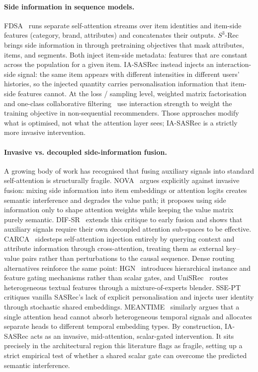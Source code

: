 \paragraph{Side information in sequence models.}
FDSA~\citep{zhang2019fdsa} runs separate self-attention streams over
item identities and item-side features (category, brand, attributes)
and concatenates their outputs. $S^3$-Rec~\citep{zhou2020s3rec} brings
side information in through pretraining objectives that mask
attributes, items, and segments. Both inject
item-side metadata: features that are constant across the
population for a given item. IA-SASRec instead injects an
interaction-side signal: the same item appears with different
intensities in different users' histories, so the injected quantity
carries personalisation information that item-side features cannot.
At the loss / sampling level, weighted matrix
factorisation~\citep{hu2008cf} and one-class collaborative
filtering~\citep{pan2008oneclass} use interaction strength to weight
the training objective in non-sequential recommenders. Those approaches modify what is
optimised, not what the attention layer sees; IA-SASRec is a strictly
more invasive intervention.

\paragraph{Invasive vs. decoupled side-information fusion.}
A growing body of work has recognised that fusing auxiliary signals
into standard self-attention is structurally fragile.
NOVA~\citep{liu2021novabert} argues explicitly against
invasive fusion: mixing side information into item embeddings
or attention logits creates semantic interference and degrades the
value path; it proposes using side information only to shape attention
weights while keeping the value matrix purely semantic.
DIF-SR~\citep{xie2022difsr} extends this critique to early fusion and
shows that auxiliary signals require their own decoupled attention
sub-spaces to be effective. CARCA~\citep{rashed2022carca} sidesteps
self-attention injection entirely by querying context and attribute
information through cross-attention, treating them as external
key--value pairs rather than perturbations to the causal sequence.
Dense routing alternatives reinforce the same point:
HGN~\citep{ma2019hgn} introduces hierarchical instance and feature
gating mechanisms rather than scalar gates, and
UniSRec~\citep{hou2022unisrec} routes heterogeneous textual features
through a mixture-of-experts blender. SSE-PT~\citep{wu2020ssept}
critiques vanilla SASRec's lack of explicit personalisation and
injects user identity through stochastic shared embeddings.
MEANTIME~\citep{cho2020meantime} similarly argues that a single
attention head cannot absorb heterogeneous temporal signals and
allocates separate heads to different temporal embedding types. By
construction, IA-SASRec acts as an invasive, mid-attention,
scalar-gated intervention. It sits precisely in the architectural
region this literature flags as fragile, setting up a strict
empirical test of whether a shared scalar gate can overcome the
predicted semantic interference.

